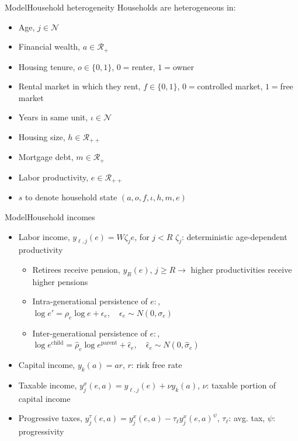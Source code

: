 \documentclass[11pt,aspectratio=169]{beamer}
\begin{document}
\begin{frame}{Model}{Household heterogeneity}
Households are heterogeneous in:
\begin{itemize}
    \item Age, $j \in \mathcal{N}$
    \item Financial wealth, $a \in \mathcal{R_{+}}$
    \item Housing tenure, $o \in \{0,1\}$, $0=$renter, $1=$owner
    \item Rental market in which they rent, $f \in \{0,1\}$, $0=$controlled market, $1=$free market
    \item Years in same unit, $\iota \in \mathcal{N}$
    \item Housing size, $h \in \mathcal{R_{++}}$
    \item Mortgage debt, $m \in \mathcal{R_{+}}$
    \item Labor productivity, $e \in \mathcal{R_{++}}$
    \item $s$ to denote household state $(a,o,f,\iota,h,m,e)$
\end{itemize}

\end{frame}

\begin{frame}{Model}{Household incomes}

\begin{itemize}
    \item Labor income, $y_{\ell,j}(e)=W \zeta_{j} e$, for $j<R$ $\zeta_{j}$: deterministic age-dependent productivity
    \begin{itemize}
        \item Retirees receive pension, $y_{R}(e)$, $j\geq R \rightarrow$ higher productivities receive higher pensions
        \item Intra-generational persistence of $e:$, $\log e' = \rho_{e} \log e + \epsilon_{e},\quad \epsilon_{e}\sim N(0,\sigma_{e})$
        \item Inter-generational persistence of $e:$, $\log e^{\text{child}} = \hat{\rho}_{e} \log e^{\text{parent}} + \hat{\epsilon}_{e},\quad \hat{\epsilon}_{e}\sim N(0,\hat{\sigma}_{e})$
    \end{itemize}
    \item Capital income, $y_{k}(a)=ar$, $r$: risk free rate
    \item Taxable income, $y^{x}_{j}(e,a)=y_{\ell,j}(e)+\nu y_{k}(a)$, $\nu$: taxable portion of capital income
    \item Progressive taxes, $y^{\tau}_{j}(e,a) = y^{x}_{j}(e,a)-\tau_{\ell}y^{x}_{j}(e,a)^{\psi}$, $\tau_{\ell}$: avg. tax, $\psi$: progressivity
\end{itemize}
\end{frame}
\end{document}
